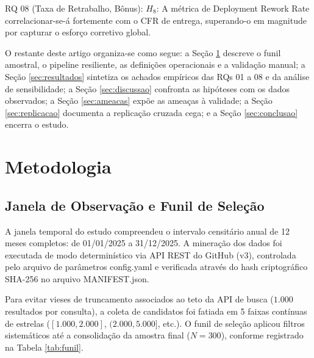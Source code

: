 \documentclass[12pt]{article}
\begin{document}
RQ 08 (Taxa de Retrabalho, Bônus): $H_{8}$: A métrica de Deployment Rework Rate correlacionar-se-á fortemente com o CFR de entrega, superando-o em magnitude por capturar o esforço corretivo global.

O restante deste artigo organiza-se como segue: a Seção \ref{sec:metodologia} descreve o funil amostral, o pipeline resiliente, as definições operacionais e a validação manual; a Seção \ref{sec:resultados} sintetiza os achados empíricos das RQs 01 a 08 e da análise de sensibilidade; a Seção \ref{sec:discussao} confronta as hipóteses com os dados observados; a Seção \ref{sec:ameacas} expõe as ameaças à validade; a Seção \ref{sec:replicacao} documenta a replicação cruzada cega; e a Seção \ref{sec:conclusao} encerra o estudo.

\section{Metodologia}
\label{sec:metodologia}

\subsection{Janela de Observação e Funil de Seleção}

A janela temporal do estudo compreendeu o intervalo censitário anual de 12 meses completos: de 01/01/2025 a 31/12/2025. A mineração dos dados foi executada de modo determinístico via API REST do GitHub (v3), controlada pelo arquivo de parâmetros config.yaml e verificada através do hash criptográfico SHA-256 no arquivo MANIFEST.json.

Para evitar vieses de truncamento associados ao teto da API de busca ($1.000$ resultados por consulta), a coleta de candidatos foi fatiada em 5 faixas contínuas de estrelas ($[1.000, 2.000]$, $(2.000, 5.000]$, etc.). O funil de seleção aplicou filtros sistemáticos até a consolidação da amostra final ($N = 300$), conforme registrado na Tabela \ref{tab:funil}.
\end{document}
